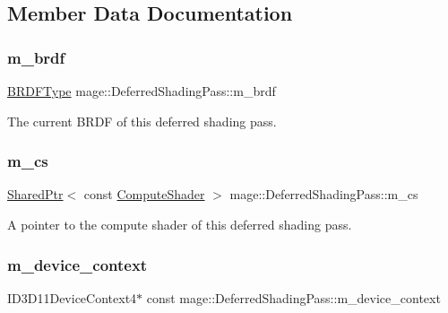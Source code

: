 \subsection{Member Data Documentation}
\hypertarget{classmage_1_1_deferred_shading_pass_a5a466f5c2ee71563f4f8ed6d042ee4b3}{}\label{classmage_1_1_deferred_shading_pass_a5a466f5c2ee71563f4f8ed6d042ee4b3} 
\subsubsection{\texorpdfstring{m\+\_\+brdf}{m\_brdf}}
{\footnotesize\ttfamily \hyperlink{namespacemage_ae7a7a03a7b34d7e2689689bb8295cd38}{B\+R\+D\+F\+Type} mage\+::\+Deferred\+Shading\+Pass\+::m\+\_\+brdf\hspace{0.3cm}{\ttfamily [private]}}

The current B\+R\+DF of this deferred shading pass. \hypertarget{classmage_1_1_deferred_shading_pass_a8d3bebdc41d116eb05d9f5a3c923f349}{}\label{classmage_1_1_deferred_shading_pass_a8d3bebdc41d116eb05d9f5a3c923f349} 
\subsubsection{\texorpdfstring{m\+\_\+cs}{m\_cs}}
{\footnotesize\ttfamily \hyperlink{namespacemage_a1e01ae66713838a7a67d30e44c67703e}{Shared\+Ptr}$<$ const \hyperlink{namespacemage_ae040329401484b076f0cd1a7c43d19c9}{Compute\+Shader} $>$ mage\+::\+Deferred\+Shading\+Pass\+::m\+\_\+cs\hspace{0.3cm}{\ttfamily [private]}}

A pointer to the compute shader of this deferred shading pass. \hypertarget{classmage_1_1_deferred_shading_pass_a05b1c649f39f267ce5a5cecdd02b8ffb}{}\label{classmage_1_1_deferred_shading_pass_a05b1c649f39f267ce5a5cecdd02b8ffb} 
\subsubsection{\texorpdfstring{m\+\_\+device\+\_\+context}{m\_device\_context}}
{\footnotesize\ttfamily I\+D3\+D11\+Device\+Context4$\ast$ const mage\+::\+Deferred\+Shading\+Pass\+::m\+\_\+device\+\_\+context\hspace{0.3cm}{\ttfamily [private]}}

